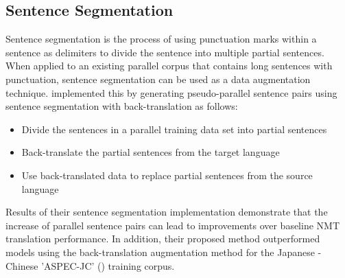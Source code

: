 





\subsection{Sentence Segmentation}

Sentence segmentation is the process of using punctuation marks within a sentence as delimiters to divide the sentence into multiple partial sentences. When applied to an existing parallel corpus that contains long sentences with punctuation, sentence segmentation can be used as a data augmentation technique. \cite{zhang_corpus_2019} implemented this by generating pseudo-parallel sentence pairs using sentence segmentation with back-translation as follows:
\begin{itemize}
    \item Divide the sentences in a parallel training data set into partial sentences
    \item Back-translate the partial sentences from the target language
    \item Use back-translated data to replace partial sentences from the source language
\end{itemize}

Results of their sentence segmentation implementation demonstrate that the increase of parallel sentence pairs can lead to improvements over baseline \acrshort{NMT} translation performance. In addition, their proposed method outperformed models using the back-translation augmentation method for the Japanese - Chinese 'ASPEC-JC' (\cite{NAKAZAWA16.621}) training corpus.

